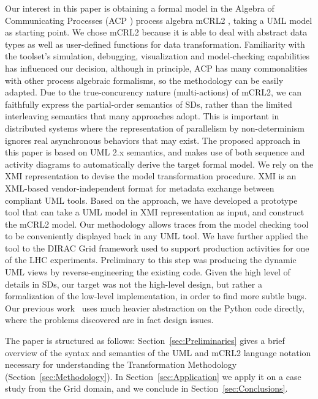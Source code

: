 \documentclass[letter]{llncs}
\begin{document}
Our interest in this paper is obtaining a formal model in the Algebra of
Communicating Processes (ACP \cite{process_algebra}) process algebra mCRL2
\cite{FormalLanguagemCRL2},
taking a UML model as starting point. We chose mCRL2 because it is able to deal
with abstract
data types as well as user-defined functions for data transformation.
Familiarity with the toolset's simulation,
debugging,
visualization and model-checking capabilities has
influenced our decision, although in principle, ACP has many commonalities with
other process algebraic formalisms,
so the methodology can be easily adapted.
Due to the true-concurency nature (multi-actions) of mCRL2, we can faithfully express the
partial-order semantics of SDs, rather than the limited interleaving semantics that many approaches 
adopt. This is important in distributed systems where the representation of parallelism by non-determinism
ignores real asynchronous behaviors that may exist.
The proposed approach in this paper is based on UML 2.x semantics, and makes use
of both sequence and activity diagrams to automatically derive the target formal model.
We rely on the XMI representation
to devise the model transformation procedure. XMI \cite{UML2.4} is an XML-based vendor-independent format for metadata exchange between
compliant UML tools.
Based on the approach, we have
developed 
a prototype tool that can take a UML model in XMI representation as input, and
construct
the mCRL2 model. Our methodology allows traces from the model
checking tool 
to be conveniently displayed back in any UML tool. 
We have further applied the tool to the DIRAC \cite{DIRAC_CommGridSolution} Grid
framework used to support production activities
for one of the LHC experiments. Preliminary to this step was producing 
the dynamic UML views by reverse-engineering the existing code. Given the high level of 
details in SDs, our target was not the high-level design, but 
rather a formalization of the low-level implementation, in order to find more subtle bugs.
Our previous work~\cite{remenska:using} uses
much heavier abstraction on the Python code directly, where the problems
discovered are in fact design issues. 

The paper is structured as follows: Section~\ref{sec:Preliminaries} gives a brief overview of the 
syntax and semantics of the UML and mCRL2 language notation necessary for understanding the Transformation Methodology (Section~\ref{sec:Methodology}).
In Section~\ref{sec:Application} we apply it on a case study from the Grid domain, and we conclude in Section~\ref{sec:Conclusions}.
\end{document}
